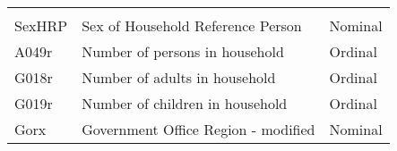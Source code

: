 \documentclass[]{article}
\begin{document}
\begin{longtable}[]{@{}lll@{}}
\begin{minipage}[t]{0.14\columnwidth}
\end{minipage}\tabularnewline
\begin{minipage}[t]{0.14\columnwidth}\raggedright
SexHRP\strut
\end{minipage} & \begin{minipage}[t]{0.64\columnwidth}\raggedright
Sex of Household Reference Person\strut
\end{minipage} & \begin{minipage}[t]{0.14\columnwidth}\raggedright
Nominal\strut
\end{minipage}\tabularnewline
\begin{minipage}[t]{0.14\columnwidth}\raggedright
A049r\strut
\end{minipage} & \begin{minipage}[t]{0.64\columnwidth}\raggedright
Number of persons in household\strut
\end{minipage} & \begin{minipage}[t]{0.14\columnwidth}\raggedright
Ordinal\strut
\end{minipage}\tabularnewline
\begin{minipage}[t]{0.14\columnwidth}\raggedright
G018r\strut
\end{minipage} & \begin{minipage}[t]{0.64\columnwidth}\raggedright
Number of adults in household\strut
\end{minipage} & \begin{minipage}[t]{0.14\columnwidth}\raggedright
Ordinal\strut
\end{minipage}\tabularnewline
\begin{minipage}[t]{0.14\columnwidth}\raggedright
G019r\strut
\end{minipage} & \begin{minipage}[t]{0.64\columnwidth}\raggedright
Number of children in household\strut
\end{minipage} & \begin{minipage}[t]{0.14\columnwidth}\raggedright
Ordinal\strut
\end{minipage}\tabularnewline
\begin{minipage}[t]{0.14\columnwidth}\raggedright
Gorx\strut
\end{minipage} & \begin{minipage}[t]{0.64\columnwidth}\raggedright
Government Office Region - modified\strut
\end{minipage} & \begin{minipage}[t]{0.14\columnwidth}\raggedright
Nominal\strut
\end{minipage}\tabularnewline

\end{longtable}
\end{document}
